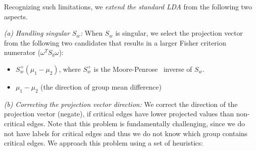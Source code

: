 Recognizing such limitations, we \emph{extend the standard LDA} from the following two aspects.

\emph{(a) Handling singular $S_w$:}
When $S_w$ is singular, we select the projection vector
from the following two candidates that results in a larger Fisher criterion numerator (\ie $\omega^TS_b\omega$):

\begin{itemize}[noitemsep, topsep=1pt, partopsep=1pt, listparindent=\parindent, leftmargin=*]

    \item $S_w^{+}(\mu_1-\mu_2)$, where $S_w^{+}$ is the Moore-Penrose~\cite{albert1972regression} inverse of $S_w$. 
    
    \item $\mu_1-\mu_2$ (\ie the direction of group mean difference)
\end{itemize}

\emph{(b) Correcting the projection vector direction:}
We correct the direction of the projection vector (\ie negate), if critical edges have lower projected values than non-critical edges.
Note that this problem is fundamentally challenging, since we do not have labels for critical edges and thus we do not know which group contains critical edges. 
We approach this problem using a set of heuristics:

